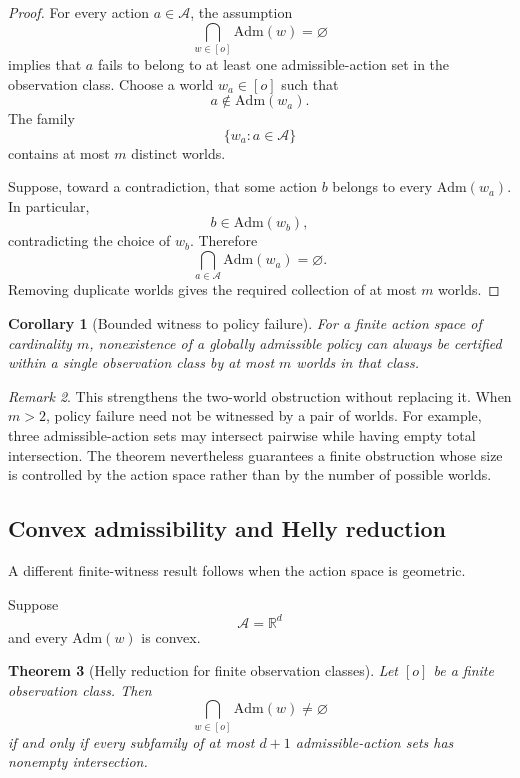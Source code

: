 \documentclass[11pt]{article}
\newtheorem{theorem}{Theorem}[section]
\newtheorem{corollary}[theorem]{Corollary}
\theoremstyle{definition}
\theoremstyle{remark}
\newtheorem{remark}[theorem]{Remark}
\newcommand{\acts}{\mathcal{A}}
\newcommand{\admissible}{\mathrm{Adm}}
\begin{document}
\begin{proof}
For every action $a\in\acts$, the assumption
\[
  \bigcap_{w\in[o]}\admissible(w)=\varnothing
\]
implies that $a$ fails to belong to at least one admissible-action set in the
observation class. Choose a world $w_a\in[o]$ such that
\[
  a\notin\admissible(w_a).
\]
The family
\[
  \{w_a:a\in\acts\}
\]
contains at most $m$ distinct worlds.

Suppose, toward a contradiction, that some action $b$ belongs to every
$\admissible(w_a)$. In particular,
\[
  b\in\admissible(w_b),
\]
contradicting the choice of $w_b$. Therefore
\[
  \bigcap_{a\in\acts}\admissible(w_a)
  =
  \varnothing.
\]
Removing duplicate worlds gives the required collection of at most $m$
worlds.
\end{proof}

\begin{corollary}[Bounded witness to policy failure]
For a finite action space of cardinality $m$, nonexistence of a globally
admissible policy can always be certified within a single observation class
by at most $m$ worlds in that class.
\end{corollary}

\begin{remark}
This strengthens the two-world obstruction without replacing it. When
$m>2$, policy failure need not be witnessed by a pair of worlds. For example,
three admissible-action sets may intersect pairwise while having empty total
intersection. The theorem nevertheless guarantees a finite obstruction whose
size is controlled by the action space rather than by the number of possible
worlds.
\end{remark}

\subsection{Convex admissibility and Helly reduction}

A different finite-witness result follows when the action space is geometric.

Suppose
\[
  \acts=\mathbb{R}^d
\]
and every $\admissible(w)$ is convex.

\begin{theorem}[Helly reduction for finite observation classes]
Let $[o]$ be a finite observation class. Then
\[
  \bigcap_{w\in[o]}\admissible(w)\neq\varnothing
\]
if and only if every subfamily of at most $d+1$ admissible-action sets has
nonempty intersection.
\end{theorem}
\end{document}
